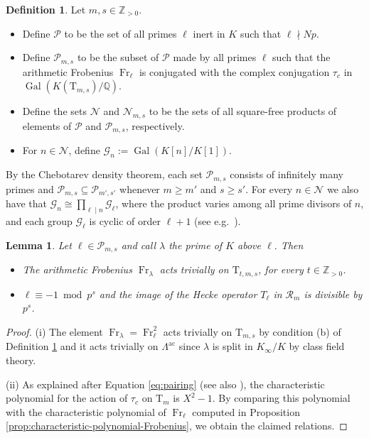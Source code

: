 \documentclass[12pt,reqno]{amsart}
\newtheorem{lemma}[theorem]{Lemma}
\theoremstyle{definition}
\newtheorem{definition}[theorem]{Definition}
\theoremstyle{remark}
\newcommand{\numberset}{\mathbb}
\newcommand{\Q}{\numberset{Q}}
\newcommand{\Z}{\numberset{Z}}
\newcommand{\T}{\boldsymbol{\mathrm{T}}}
\newcommand{\calR}{\mathcal{R}}
\DeclareMathOperator{\Gal}{Gal}
\DeclareMathOperator{\Fr}{Fr}
\newcommand{\ac}{\mathrm{ac}}
\newcommand{\gl}{\lambda}
\newcommand{\gL}{\Lambda}
\begin{document}
    \begin{definition}\label{dfn:admissible-primes}
    Let $m,s\in\Z_{>0}$.
	\begin{itemize}
			\item[(a)] Define $\mathcal{P}$ to be the set of all primes $\ell$ inert in $K$ such that $\ell\nmid Np$.
			\item[(b)] Define $\mathcal{P}_{m,s}$ to be the subset of $\mathcal{P}$ made by all primes $\ell$ such that the arithmetic Frobenius $\Fr_\ell$ is conjugated with the complex conjugation $\tau_c$ in $\Gal(K(\T_{m,s})/\Q)$.
			\item[(c)] Define the sets $\mathcal{N}$ and $\mathcal{N}_{m,s}$ to be the sets of all square-free products of elements of $\mathcal{P}$ and $\mathcal{P}_{m,s}$, respectively.
                \item[(d)] For $n \in\mathcal{N}$, define $\mathcal{G}_n:=\Gal(K[n]/K[1])$.
	\end{itemize}
    \end{definition}

    By the Chebotarev density theorem, each set $\mathcal{P}_{m,s}$ consists of infinitely many primes and $\mathcal{P}_{m,s}\subseteq\mathcal{P}_{m',s'}$ whenever $m\ge m'$ and $s\ge s'$. For every $n\in\mathcal{N}$ we also have that $\mathcal{G}_n\cong \prod_{\ell\mid n}\mathcal{G}_\ell$, where the product varies among all prime divisors of $n$, and each group $\mathcal{G}_\ell$ is cyclic of order $\ell+1$ (see e.g.~\cite[§3]{Gross91:Kolyvagins-work}).

        
    \begin{lemma}\label{lem:Tl-acts-as-0}
        Let $\ell\in\mathcal{P}_{m,s}$ and call $\gl$ the prime of $K$ above $\ell$. Then
        \begin{itemize}
            \item[(i)] The arithmetic Frobenius $\Fr_\lambda$ acts trivially on $\T_{t,m,s}$, for every $t\in\Z_{>0}$. 
            \item[(ii)] $\ell\equiv -1\bmod p^s$ and the image of the Hecke operator $T_\ell$ in $\calR_m$ is divisible by $p^s$.
        \end{itemize}
    \end{lemma}
    \begin{proof}
        (i) The element $\Fr_\gl=\Fr_\ell^2$ acts trivially on $\T_{m,s}$ by condition (b) of Definition \ref{dfn:admissible-primes} and it acts trivially on $\gL^{\ac}$ since $\gl$ is split in $K_\infty/K$ by class field theory.

        (ii) As explained after Equation \eqref{eq:pairing} (see also \cite[Lemma 4.1.15]{Zerman24:PhD-thesis}), the characteristic polynomial for the action of $\tau_c$ on $\T_m$ is $X^2-1$. By comparing this polynomial with the characteristic polynomial of $\Fr_\ell$ computed in Proposition \ref{prop:characteristic-polynomial-Frobenius}, we obtain the claimed relations.
    \end{proof}
\end{document}
